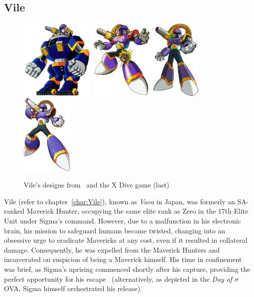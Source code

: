 \subsection{Vile}\label{boss:Vile}
\begin{figure}[htp]
	\centering
	\includegraphics[height=3.9cm]{figures/X1/Sigma_stages/VileRideArmor.jpg}
	\includegraphics[height=3.9cm]{figures/X1/Sigma_stages/Vile.jpg}
	\includegraphics[height=3.9cm]{figures/X1/Sigma_stages/MhxVile.png}	
	\includegraphics[height=3.9cm]{figures/X1/Sigma_stages/X_DiVE_Vile.png}
	\caption{Vile's designs from~\cite{book:MMX_Complete_art} and the X Dive game (last)}
\end{figure}

Vile (refer to chapter~\ref{char:Vile}), known as \textit{Vava} in Japan, was formerly an SA-ranked Maverick Hunter, occupying the same elite rank as Zero in the 17th Elite Unit under Sigma's command. However, due to a malfunction in his electronic brain, his mission to safeguard humans became twisted, changing into an obsessive urge to eradicate Mavericks at any cost, even if it resulted in collateral damage. Consequently, he was expelled from the Maverick Hunters and incarcerated on suspicion of being a Maverick himself. His time in confinement was brief, as Sigma's uprising commenced shortly after his capture, providing the perfect opportunity for his escape~\cite{Xcoll1:Manual_X1,MHX:manual, wayback:X_resources} (alternatively, as depicted in the \textit{Day of $\sigma$} OVA, Sigma himself orchestrated his release).

